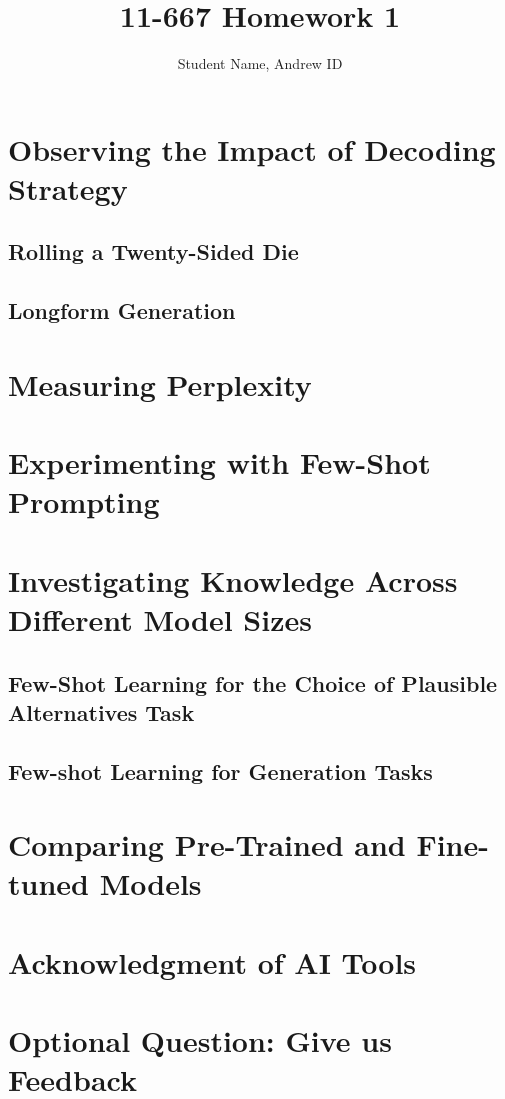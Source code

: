 \documentclass[11pt,a4paper]{article}
\begin{document}
 

\title{11-667 Homework 1}
\author{Student Name, Andrew ID}
\maketitle

\section{Observing the Impact of Decoding Strategy}
\subsection{Rolling a Twenty-Sided Die}
\subsection{Longform Generation}

\section{Measuring Perplexity}

\section{Experimenting with Few-Shot Prompting}


\section{Investigating Knowledge Across Different Model Sizes}
\subsection{Few-Shot Learning for the Choice of Plausible Alternatives Task}
\subsection{Few-shot Learning for Generation Tasks}

\section{Comparing Pre-Trained and Fine-tuned Models}

\section{Acknowledgment of AI Tools}

\section{Optional Question: Give us Feedback}
\end{document}
